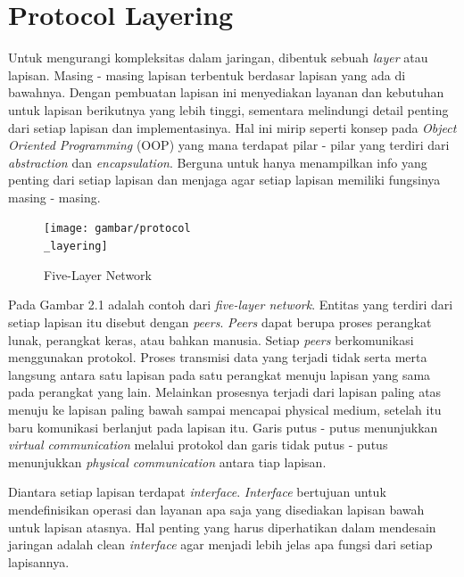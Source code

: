 \section{Protocol Layering}

Untuk mengurangi kompleksitas dalam jaringan, dibentuk sebuah \emph{layer} atau lapisan. Masing - masing lapisan terbentuk berdasar lapisan yang ada di bawahnya. Dengan pembuatan lapisan ini menyediakan layanan dan kebutuhan untuk lapisan berikutnya yang lebih tinggi, sementara melindungi detail penting dari setiap lapisan dan implementasinya. Hal ini mirip seperti konsep pada \emph{Object Oriented Programming} (OOP) yang mana terdapat pilar - pilar yang terdiri dari \emph{abstraction} dan \emph{encapsulation}. Berguna untuk hanya menampilkan info yang penting dari setiap lapisan dan menjaga agar setiap lapisan memiliki fungsinya masing - masing.

\begin{figure}[H]
  \centering{}
	\texttt{[image: gambar/protocol\\\_layering]}
  \caption{Five-Layer Network}
\end{figure}

Pada Gambar 2.1 adalah contoh dari \emph{five-layer network}. Entitas yang terdiri dari setiap lapisan itu disebut dengan \emph{peers}. \emph{Peers} dapat berupa proses perangkat lunak, perangkat keras, atau bahkan manusia. Setiap \emph{peers} berkomunikasi menggunakan protokol. Proses transmisi data yang terjadi tidak serta merta langsung antara satu lapisan pada satu perangkat menuju lapisan yang sama pada perangkat yang lain. Melainkan prosesnya terjadi dari lapisan paling atas menuju ke lapisan paling bawah sampai mencapai physical medium, setelah itu baru komunikasi berlanjut pada lapisan itu. Garis putus - putus menunjukkan \emph{virtual communication} melalui protokol dan garis tidak putus - putus menunjukkan \emph{physical communication} antara tiap lapisan.

Diantara setiap lapisan terdapat \emph{interface}. \emph{Interface} bertujuan untuk mendefinisikan operasi dan layanan apa saja yang disediakan lapisan bawah untuk lapisan atasnya. Hal penting yang harus diperhatikan dalam mendesain jaringan adalah clean \emph{interface} agar menjadi lebih jelas apa fungsi dari setiap lapisannya.

